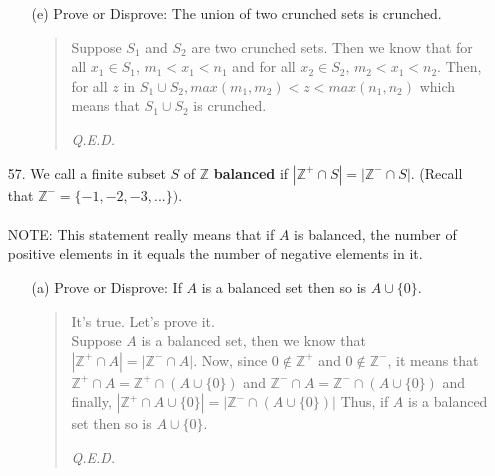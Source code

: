\documentclass[12pt, a4paper]{article}                      %
\begin{document}
\begin{itemize}
\begin{itemize}
\item[]

\item[(e)]
Prove or Disprove: The union of two crunched sets is crunched.
\begin{quote}
Suppose $S_1$ and $S_2$ are two crunched sets.
Then we know that for all $x_1 \in S_1$, $m_1 < x_1 < n_1$ and for all $x_2 \in S_2$, $m_2 < x_1 < n_2$. Then, for all $z$ in $S_1 \cup S_2, max(m_1, m_2) < z < max(n_1, n_2)$ which means that $S_1 \cup S_2$ is crunched.
\begin{flushright}
\textit{Q.E.D.}
\end{flushright}
\end{quote}
\end{itemize}

\item[]
\item[]

\item[57.]
We call a finite subset $S$ of $\mathbb{Z}$ \textbf{balanced} if
$|\mathbb{Z}^+ \cap S| = |\mathbb{Z}^- \cap S|.$ (Recall that $\mathbb{Z}^- = \{-1, -2, -3, ...\})$.
\\\\
NOTE: This statement really means that if $A$ is balanced, the number of positive elements in it equals
the number of negative elements in it.
\begin{itemize}
\item[]
\item[(a)]
Prove or Disprove: If $A$ is a balanced set then so is $A \cup \{0\}$.
\begin{quote}
It's true. Let's prove it.\\
Suppose $A$ is a balanced set, then we know that $|\mathbb{Z}^+ \cap A| = |\mathbb{Z}^- \cap A|$.
Now, since $0 \notin \mathbb{Z}^+$ and $0 \notin \mathbb{Z}^-$, it means that
$\mathbb{Z}^+ \cap A = \mathbb{Z}^+ \cap (A \cup \{0\})$ and
$\mathbb{Z}^- \cap A = \mathbb{Z}^- \cap (A \cup \{0\})$
and finally, $|\mathbb{Z}^+ \cap A \cup \{0\}| = |\mathbb{Z}^- \cap (A \cup \{0\})|$
Thus, if $A$ is a balanced set then so is $A \cup \{0\}$.
\begin{flushright}
\textit{Q.E.D.}
\end{flushright}
\end{quote}

\item[]


\end{itemize}
\end{itemize}
\end{document}
